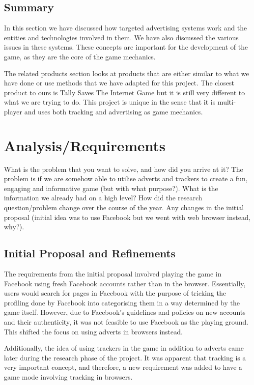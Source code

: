 \documentclass{l4proj}
\begin{document}
\section{Summary}
In this section we have discussed how targeted advertising systems work and the entities and technologies involved in them. We have also discussed the various issues in these systems. These concepts are important for the development of the game, as they are the core of the game mechanics. 

The related products section looks at products that are either similar to what we have done or use methods that we have adapted for this project. The closest product to ours is Tally Saves The Internet Game but it is still very different to what we are trying to do. This project is unique in the sense that it is multi-player and uses both tracking and advertising as game mechanics. 

\chapter{Analysis/Requirements}
What is the problem that you want to solve, and how did you arrive at it?
The problem is if we are somehow able to utilise adverts and trackers to create a fun, engaging and informative game (but with what purpose?). What is the information we already had on a high level? How did the research question/problem change over the course of the year. Any changes in the initial proposal (initial idea was to use Facebook but we went with web browser instead, why?).

\section{Initial Proposal and Refinements}
The requirements from the initial proposal involved playing the game in Facebook using fresh Facebook accounts rather than in the browser. Essentially, users would search for pages in Facebook with the purpose of tricking the profiling done by Facebook into categorising them in a way determined by the game itself. However, due to Facebook's guidelines and policies on new accounts and their authenticity, it was not feasible to use Facebook as the playing ground. This shifted the focus on using adverts in browsers instead.

Additionally, the idea of using trackers in the game in addition to adverts came later during the research phase of the project. It was apparent that tracking is a very important concept, and therefore, a new requirement was added to have a game mode involving tracking in browsers.
\end{document}
